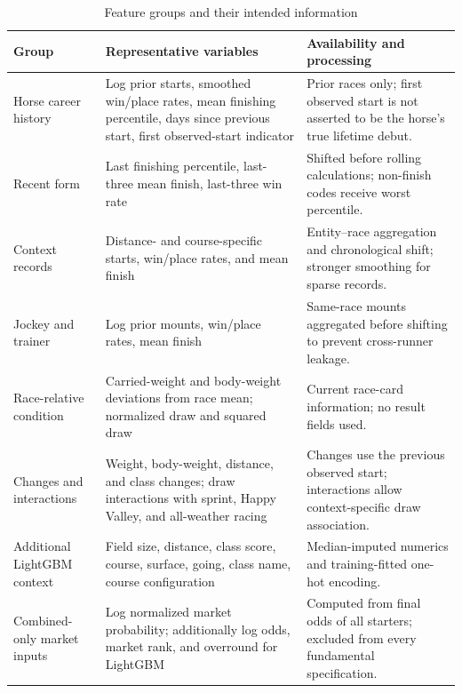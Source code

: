 \begin{table}[htbp]
\centering
\caption{Feature groups and their intended information}\label{tab:feature-groups}
\small
\begin{tabularx}{\textwidth}{L{3.2cm} Y L{3.8cm}}
\toprule
\textbf{Group} & \textbf{Representative variables} & \textbf{Availability and processing} \\
\midrule
Horse career history & Log prior starts, smoothed win/place rates, mean finishing percentile, days since previous start, first observed-start indicator & Prior races only; first observed start is not asserted to be the horse's true lifetime debut. \\
\addlinespace
Recent form & Last finishing percentile, last-three mean finish, last-three win rate & Shifted before rolling calculations; non-finish codes receive worst percentile. \\
\addlinespace
Context records & Distance- and course-specific starts, win/place rates, and mean finish & Entity--race aggregation and chronological shift; stronger smoothing for sparse records. \\
\addlinespace
Jockey and trainer & Log prior mounts, win/place rates, mean finish & Same-race mounts aggregated before shifting to prevent cross-runner leakage. \\
\addlinespace
Race-relative condition & Carried-weight and body-weight deviations from race mean; normalized draw and squared draw & Current race-card information; no result fields used. \\
\addlinespace
Changes and interactions & Weight, body-weight, distance, and class changes; draw interactions with sprint, Happy Valley, and all-weather racing & Changes use the previous observed start; interactions allow context-specific draw association. \\
\addlinespace
Additional LightGBM context & Field size, distance, class score, course, surface, going, class name, course configuration & Median-imputed numerics and training-fitted one-hot encoding. \\
\addlinespace
Combined-only market inputs & Log normalized market probability; additionally log odds, market rank, and overround for LightGBM & Computed from final odds of all starters; excluded from every fundamental specification. \\
\bottomrule
\end{tabularx}
\end{table}

